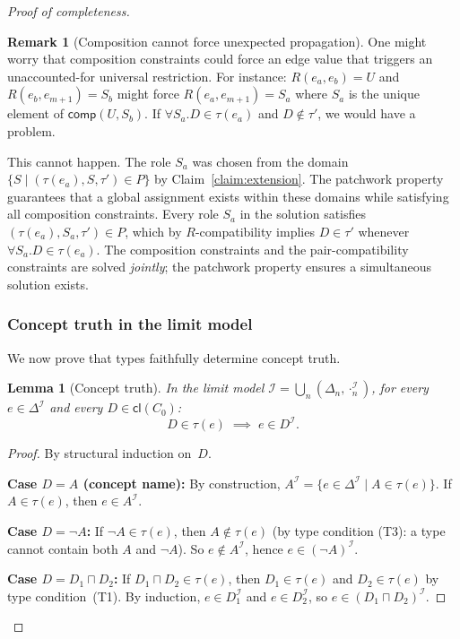 \documentclass[a4paper,11pt]{article}
\newtheorem{lemma}[theorem]{Lemma}
\theoremstyle{definition}
\newtheorem{remark}[theorem]{Remark}
\newcommand{\DeltaI}{\ensuremath{\Delta^{\mathcal{I}}}}
\newcommand{\interp}{\ensuremath{\mathcal{I}}}
\newcommand{\comp}{\ensuremath{\mathsf{comp}}}
\newcommand{\cl}{\ensuremath{\mathsf{cl}}}
\begin{document}
\begin{proof}[Proof of completeness]
\begin{remark}[Composition cannot force unexpected propagation]
\label{rem:composition-force}
One might worry that composition constraints could force an edge value
that triggers an unaccounted-for universal restriction.  For instance:
$R(e_a, e_b) = U$ and $R(e_b, e_{m+1}) = S_b$ might force $R(e_a,
e_{m+1}) = S_a$ where $S_a$ is the unique element of $\comp(U, S_b)$.
If $\forall S_a.D \in \tau(e_a)$ and $D \notin \tau'$, we would have
a problem.

This cannot happen.  The role $S_a$ was chosen from the domain $\{S
\mid (\tau(e_a), S, \tau') \in P\}$ by Claim~\ref{claim:extension}.
The patchwork property guarantees that a global assignment
exists within these domains while satisfying all composition
constraints.  Every role $S_a$ in the solution satisfies $(\tau(e_a),
S_a, \tau') \in P$, which by $R$-compatibility implies $D \in \tau'$
whenever $\forall S_a.D \in \tau(e_a)$.  The composition constraints
and the pair-compatibility constraints are solved \emph{jointly}; the
patchwork property ensures a simultaneous solution exists.
\end{remark}

\subsubsection*{Concept truth in the limit model}

We now prove that types faithfully determine concept truth.

\begin{lemma}[Concept truth]
\label{lem:truth}
In the limit model $\interp = \bigcup_{n} (\Delta_n,
\cdot^{\interp}_n)$, for every $e \in \DeltaI$ and every $D \in
\cl(C_0)$:
\[
  D \in \tau(e) \;\implies\; e \in D^{\interp}.
\]
\end{lemma}

\begin{proof}
By structural induction on~$D$.

\smallskip\noindent\textbf{Case $D = A$ (concept name):}\;
By construction, $A^{\interp} = \{e \in \DeltaI \mid A \in \tau(e)\}$.
If $A \in \tau(e)$, then $e \in A^{\interp}$.

\smallskip\noindent\textbf{Case $D = \neg A$:}\;
If $\neg A \in \tau(e)$, then $A \notin \tau(e)$ (by type condition
(T3): a type cannot contain both $A$ and $\neg A$).  So $e \notin
A^{\interp}$, hence $e \in (\neg A)^{\interp}$.

\smallskip\noindent\textbf{Case $D = D_1 \sqcap D_2$:}\;
If $D_1 \sqcap D_2 \in \tau(e)$, then $D_1 \in \tau(e)$ and $D_2 \in
\tau(e)$ by type condition~(T1).  By induction, $e \in
D_1^{\interp}$ and $e \in D_2^{\interp}$, so $e \in (D_1 \sqcap
D_2)^{\interp}$.


\end{proof}
\end{proof}
\end{document}
